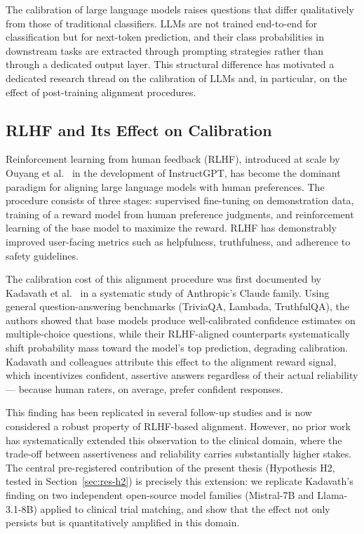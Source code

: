 The calibration of large language models raises questions that differ 
qualitatively from those of traditional classifiers. LLMs are not trained 
end-to-end for classification but for next-token prediction, and their 
class probabilities in downstream tasks are extracted through prompting 
strategies rather than through a dedicated output layer. This structural 
difference has motivated a dedicated research thread on the calibration 
of LLMs and, in particular, on the effect of post-training alignment 
procedures.

\subsection{RLHF and Its Effect on Calibration}
\label{subsec:sota-rlhf}

Reinforcement learning from human feedback (RLHF), introduced at scale 
by Ouyang et al.~\cite{ouyang2022training} in the development of 
InstructGPT, has become the dominant paradigm for aligning large 
language models with human preferences. The procedure consists of three 
stages: supervised fine-tuning on demonstration data, training of a 
reward model from human preference judgments, and reinforcement 
learning of the base model to maximize the reward. RLHF has 
demonstrably improved user-facing metrics such as helpfulness, 
truthfulness, and adherence to safety guidelines.

The calibration cost of this alignment procedure was first documented 
by Kadavath et al.~\cite{kadavath2022know} in a systematic study of 
Anthropic's Claude family. Using general question-answering benchmarks 
(TriviaQA, Lambada, TruthfulQA), the authors showed that base models 
produce well-calibrated confidence estimates on multiple-choice 
questions, while their RLHF-aligned counterparts systematically shift 
probability mass toward the model's top prediction, degrading 
calibration. Kadavath and colleagues attribute this effect to the 
alignment reward signal, which incentivizes confident, assertive 
answers regardless of their actual reliability --- because human 
raters, on average, prefer confident responses.

This finding has been replicated in several follow-up studies and is 
now considered a robust property of RLHF-based alignment. However, no 
prior work has systematically extended this observation to the clinical 
domain, where the trade-off between assertiveness and reliability 
carries substantially higher stakes. The central pre-registered 
contribution of the present thesis (Hypothesis H2, tested in 
Section~\ref{sec:res-h2}) is precisely this extension: we replicate 
Kadavath's finding on two independent open-source model families 
(Mistral-7B and Llama-3.1-8B) applied to clinical trial matching, and 
show that the effect not only persists but is quantitatively amplified 
in this domain.

